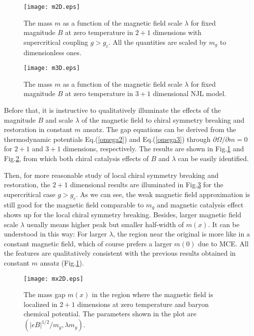 \documentclass[aps,prd,amsmath,two column,amssymb,showpacs]{revtex4}
\begin{document}
\begin{figure}[!htb]
	\begin{center}
		\texttt{[image: m2D.eps]}
		\caption{The mass $m$ as a function of the magnetic field scale $\lambda$ for fixed magnitude $B$ at zero temperature in $2+1$ dimensions with supercritical coupling $g>g_c$. All the quantities are scaled by $m_g$ to dimensionless ones.\label{m2D}}
	\end{center}
\end{figure}
\begin{figure}[!htb]
	\begin{center}
		\texttt{[image: m3D.eps]}
		\caption{The mass $m$ as a function of the magnetic field scale $\lambda$ for fixed magnitude $B$ at zero temperature in $3+1$ dimensional NJL model.\label{m3D}}
	\end{center}
\end{figure}
Before that, it is instructive to qualitatively illuminate the effects of the magnitude $B$ and scale $\lambda$ of the magnetic field to chiral symmetry breaking and restoration in constant $m$ ansatz. The gap equations can be derived from the thermodynamic potentials Eq.(\ref{omega2}) and Eq.(\ref{omega3}) through $\partial \Omega/\partial m=0$ for $2+1$ and $3+1$ dimensions, respectively. The results are shown in Fig.\ref{m2D} and Fig.\ref{m3D}, from which both chiral catalysis effects of $B$ and $\lambda$ can be easily identified.


Then, for more reasonable study of local chiral symmetry breaking and restoration, the $2+1$ dimensional results are illuminated in Fig.\ref{mx2} for the supercritical case $g>g_c$. As we can see, the weak magnetic field approximation is still good for the magnetic field comparable to $m_g$ and magnetic catalysis effect shows up for the local chiral symmetry breaking. Besides, larger magnetic field scale $\lambda$ usually means higher peak but smaller half-width of $m(x)$. It can be understood in this way: For larger $\lambda$, the region near the original is more like in a constant magnetic field, which of course prefers a larger $m(0)$ due to MCE. All the features are qualitatively consistent with the previous results obtained in constant $m$ ansatz (Fig.\ref{m2D}).
\begin{figure}[!htb]
	\begin{center}
		\texttt{[image: mx2D.eps]}
		\caption{The mass gap $m(x)$ in the region where the magnetic field is localized in $2+1$ dimensions at zero temperature and baryon chemical potential. The parameters shown in the plot are $(|eB|^{1/2}/m_g,\lambda m_g)$.}\label{mx2}
	\end{center}
\end{figure}
\end{document}
